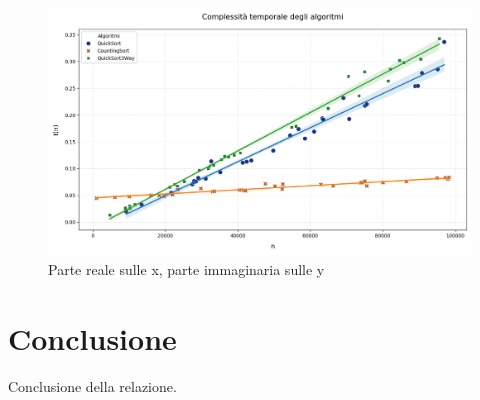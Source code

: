 \documentclass[a4paper, 11pt]{article}
\begin{document}
\begin{figure} [H]
    \centering
    \includegraphics[scale=0.5]{Immagini/Grafico.png}
    \caption*{Parte reale sulle x, parte immaginaria sulle y}
\end{figure}

\section{Conclusione}
Conclusione della relazione.
\end{document}
